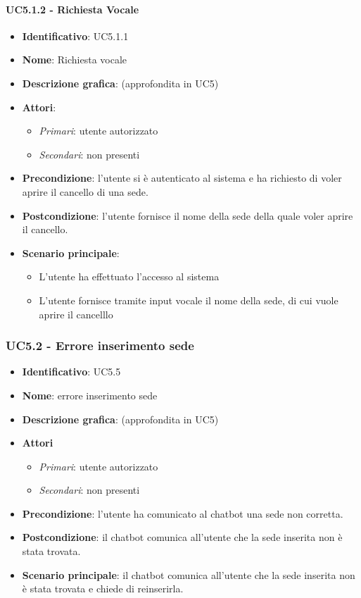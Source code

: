 \paragraph{UC5.1.2 - Richiesta Vocale}
\begin{itemize}
   \item \textbf{Identificativo}: UC5.1.1
   \item \textbf{Nome}: Richiesta vocale
   \item \textbf{Descrizione grafica}: (approfondita in UC5)
   \item \textbf{Attori}:
   \begin{itemize} 
       \item \textit{Primari}: utente autorizzato
       \item \textit{Secondari}: non presenti
   \end{itemize}
       \item \textbf{Precondizione}: l'utente si è autenticato al sistema e ha richiesto di voler aprire il cancello di una sede. 
       \item \textbf{Postcondizione}: l'utente fornisce il nome della sede della quale voler aprire il cancello.
    \item \textbf{Scenario principale}: 
       \begin{itemize}
           \item L'utente ha effettuato l'accesso al sistema 
           \item L'utente fornisce tramite input vocale il nome della sede, di cui vuole aprire il cancelllo
       \end{itemize}
\end{itemize}

\subsubsection{UC5.2 - Errore inserimento sede}
\begin{itemize}
    \item \textbf{Identificativo}: UC5.5
    \item \textbf{Nome}: errore inserimento sede
    \item \textbf{Descrizione grafica}: (approfondita in UC5)
    \item \textbf{Attori}
 \begin{itemize} 
    \item \textit{Primari}: utente autorizzato 
    \item \textit{Secondari}: non presenti
 \end{itemize}
 \item \textbf{Precondizione}: l'utente ha comunicato al chatbot una sede non corretta.
 \item \textbf{Postcondizione}: il chatbot comunica all'utente che la sede inserita non è stata trovata.
 \item \textbf{Scenario principale}: il chatbot comunica all'utente che la sede inserita non è stata trovata e chiede di reinserirla.
\end{itemize}
\newpage